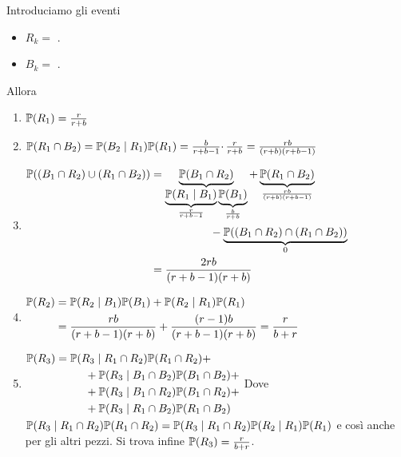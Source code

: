 \Soluzione

\Soluzione

\Soluzione

Introduciamo gli eventi
\begin{itemize}
	\item $R_{k} =$ .
	\item $B_{k} =$ .
\end{itemize}
Allora
\begin{enumerate}
	\item $\mathbb{P}(R_{1}) =\frac{r}{r+b}$
	\item $\mathbb{P}(R_{1} \cap B_{2}) =\mathbb{P}(B_{2} \mid R_{1})\mathbb{P}(R_{1}) =\frac{b}{r+b-1} \cdotp \frac{r}{r+b} =\frac{rb}{(r+b)(r+b-1)}$
	\item $
	\begin{aligned}
		\mathbb{P}((B_{1} \cap R_{2}) \cup (R_{1} \cap B_{2})) & =\underbrace{\mathbb{P}(B_{1} \cap R_{2})}_{\underbrace{\mathbb{P}(R_{1} \mid B_{1})}_{\frac{r}{r+b-1}}\underbrace{\mathbb{P}(B_{1})}_{\frac{b}{r+b}}} +\underbrace{\mathbb{P}(R_{1} \cap B_{2})}_{\frac{rb}{(r+b)(r+b-1)}}\\
		 & \ \ \ \ \ \ \ \ \ \ \ \ \ \ \ \ -\underbrace{\mathbb{P}((B_{1} \cap R_{2}) \cap (R_{1} \cap B_{2}))}_{0}\\
		 & =\frac{2rb}{(r+b-1)(r+b)}
	\end{aligned}$
	\item $
	\begin{aligned}
		\mathbb{P}(R_{2}) & =\mathbb{P}(R_{2} \mid B_{1})\mathbb{P}(B_{1}) +\mathbb{P}(R_{2} \mid R_{1})\mathbb{P}(R_{1})\\
		 & =\frac{rb}{(r+b-1)(r+b)} +\frac{(r-1) b}{(r+b-1)(r+b)} =\frac{r}{b+r}
	\end{aligned}$
	\item $
	\begin{aligned}
		\mathbb{P}(R_{3}) & =\mathbb{P}(R_{3} \mid R_{1} \cap R_{2})\mathbb{P}(R_{1} \cap R_{2}) +\\
		 & \ \ \ \ \ \ \ \ +\mathbb{P}(R_{3} \mid B_{1} \cap B_{2})\mathbb{P}(B_{1} \cap B_{2}) +\\
		 & \ \ \ \ \ \ \ \ +\mathbb{P}(R_{3} \mid B_{1} \cap R_{2})\mathbb{P}(B_{1} \cap R_{2}) +\\
		 & \ \ \ \ \ \ \ \ +\mathbb{P}(R_{3} \mid R_{1} \cap B_{2})\mathbb{P}(R_{1} \cap B_{2})
	\end{aligned}$
	Dove $\mathbb{P}(R_{3} \mid R_{1} \cap R_{2})\mathbb{P}(R_{1} \cap R_{2}) =\mathbb{P}(R_{3} \mid R_{1} \cap R_{2})\mathbb{P}(R_{2} \mid R_{1})\mathbb{P}(R_{1})$ e così anche per gli altri pezzi. Si trova infine $\mathbb{P}(R_{3}) =\frac{r}{b+r}$.
\end{enumerate}

